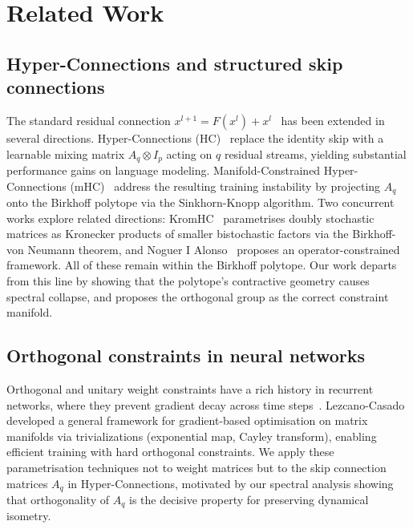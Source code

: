 
\section{Related Work}\label{sec:related-work}

\subsection{Hyper-Connections and structured skip connections}

The standard residual connection $x^{l+1} = F(x^l) + x^l$~\cite{he2016deep} has been extended in several directions. Hyper-Connections (HC)~\cite{zhu2024hyperconnections} replace the identity skip with a learnable mixing matrix $A_q \otimes I_p$ acting on $q$ residual streams, yielding substantial performance gains on language modeling. Manifold-Constrained Hyper-Connections (mHC)~\cite{xie2025mhc} address the resulting training instability by projecting $A_q$ onto the Birkhoff polytope via the Sinkhorn-Knopp algorithm. Two concurrent works explore related directions: KromHC~\cite{kromhc2026} parametrises doubly stochastic matrices as Kronecker products of smaller bistochastic factors via the Birkhoff-von Neumann theorem, and Noguer I Alonso~\cite{noguer2026} proposes an operator-constrained framework. All of these remain within the Birkhoff polytope. Our work departs from this line by showing that the polytope's contractive geometry causes spectral collapse, and proposes the orthogonal group as the correct constraint manifold.

\subsection{Orthogonal constraints in neural networks}

Orthogonal and unitary weight constraints have a rich history in recurrent networks, where they prevent gradient decay across time steps~\cite{arjovsky2016unitary,wisdom2016full}. Lezcano-Casado~\cite{lezcano2019trivializations} developed a general framework for gradient-based optimisation on matrix manifolds via trivializations (exponential map, Cayley transform), enabling efficient training with hard orthogonal constraints. We apply these parametrisation techniques not to weight matrices but to the skip connection matrices $A_q$ in Hyper-Connections, motivated by our spectral analysis showing that orthogonality of $A_q$ is the decisive property for preserving dynamical isometry.


